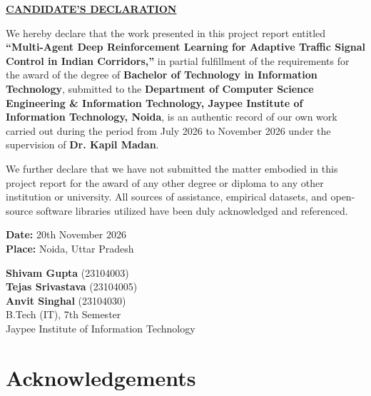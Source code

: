 \documentclass[12pt,a4paper,oneside]{report}
\begin{document}
\newpage

\begin{center}
    {\fontsize{16}{20}\bfseries\underline{CANDIDATE'S DECLARATION}\par}
\end{center}

\vspace{1.0cm}
\noindent We hereby declare that the work presented in this project report entitled \textbf{``Multi-Agent Deep Reinforcement Learning for Adaptive Traffic Signal Control in Indian Corridors,''} in partial fulfillment of the requirements for the award of the degree of \textbf{Bachelor of Technology in Information Technology}, submitted to the \textbf{Department of Computer Science Engineering \& Information Technology, Jaypee Institute of Information Technology, Noida}, is an authentic record of our own work carried out during the period from July 2026 to November 2026 under the supervision of \textbf{Dr. Kapil Madan}.

\vspace{0.8cm}
\noindent We further declare that we have not submitted the matter embodied in this project report for the award of any other degree or diploma to any other institution or university. All sources of assistance, empirical datasets, and open-source software libraries utilized have been duly acknowledged and referenced.

\vspace{3.0cm}
\noindent
\begin{minipage}[t]{0.5\textwidth}
    \textbf{Date:} 20th November 2026\\
    \textbf{Place:} Noida, Uttar Pradesh
\end{minipage}
\hfill
\begin{minipage}[t]{0.45\textwidth}
    \raggedleft
    \textbf{Shivam Gupta} (23104003)\\[0.2cm]
    \textbf{Tejas Srivastava} (23104005)\\[0.2cm]
    \textbf{Anvit Singhal} (23104030)\\[0.3cm]
    B.Tech (IT), 7th Semester\\
    Jaypee Institute of Information Technology
\end{minipage}

\newpage

\chapter*{Acknowledgements}
\end{document}
